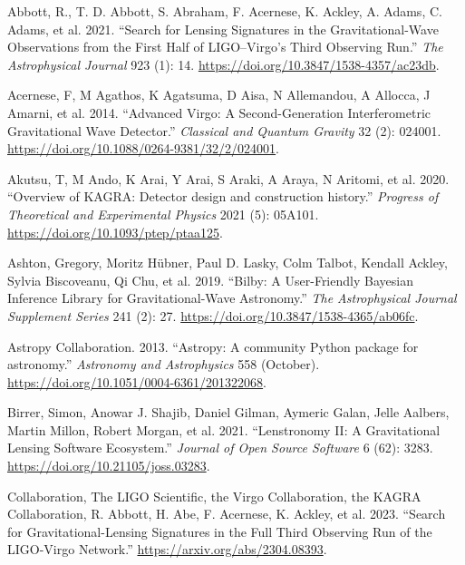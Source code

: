 \documentclass[10pt,a4paper,onecolumn]{article}
\newlength{\cslhangindent}
\newenvironment{CSLReferences}[3] %
 {%
  \setlength{\parindent}{0pt}
  \ifodd #1 \everypar{\setlength{\hangindent}{\cslhangindent}}\ignorespaces\fi
  \ifnum #2 > 0
  \setlength{\parskip}{#2\baselineskip}
  \fi
 }%
 {}
\begin{document}
\label{refs}
\begin{CSLReferences}{1}{0}
\bibitem[\citeproctext]{ref-Abbott2021}
Abbott, R., T. D. Abbott, S. Abraham, F. Acernese, K. Ackley, A. Adams,
C. Adams, et al. 2021. {``Search for Lensing Signatures in the
Gravitational-Wave Observations from the First Half of LIGO--Virgo's
Third Observing Run.''} \emph{The Astrophysical Journal} 923 (1): 14.
\url{https://doi.org/10.3847/1538-4357/ac23db}.

Acernese, F, M Agathos, K Agatsuma, D Aisa, N Allemandou, A Allocca, J
Amarni, et al. 2014. {``Advanced Virgo: A Second-Generation
Interferometric Gravitational Wave Detector.''} \emph{Classical and
Quantum Gravity} 32 (2): 024001.
\url{https://doi.org/10.1088/0264-9381/32/2/024001}.

Akutsu, T, M Ando, K Arai, Y Arai, S Araki, A Araya, N Aritomi, et al.
2020. {``{Overview of KAGRA: Detector design and construction
history}.''} \emph{Progress of Theoretical and Experimental Physics}
2021 (5): 05A101. \url{https://doi.org/10.1093/ptep/ptaa125}.

Ashton, Gregory, Moritz Hübner, Paul D. Lasky, Colm Talbot, Kendall
Ackley, Sylvia Biscoveanu, Qi Chu, et al. 2019. {``Bilby: A
User-Friendly Bayesian Inference Library for Gravitational-Wave
Astronomy.''} \emph{The Astrophysical Journal Supplement Series} 241
(2): 27. \url{https://doi.org/10.3847/1538-4365/ab06fc}.

Astropy Collaboration. 2013. {``{Astropy: A community Python package for
astronomy}.''} \emph{Astronomy and Astrophysics} 558 (October).
\url{https://doi.org/10.1051/0004-6361/201322068}.

Birrer, Simon, Anowar J. Shajib, Daniel Gilman, Aymeric Galan, Jelle
Aalbers, Martin Millon, Robert Morgan, et al. 2021. {``Lenstronomy II: A
Gravitational Lensing Software Ecosystem.''} \emph{Journal of Open
Source Software} 6 (62): 3283.
\url{https://doi.org/10.21105/joss.03283}.

Collaboration, The LIGO Scientific, the Virgo Collaboration, the KAGRA
Collaboration, R. Abbott, H. Abe, F. Acernese, K. Ackley, et al. 2023.
{``Search for Gravitational-Lensing Signatures in the Full Third
Observing Run of the LIGO-Virgo Network.''}
\url{https://arxiv.org/abs/2304.08393}.


\end{CSLReferences}
\end{document}
